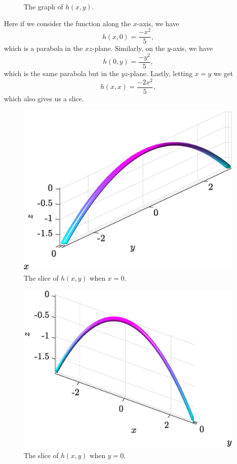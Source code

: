 \documentclass[12pt]{article} %
\begin{document}
\begin{solution}
\begin{enumerate}[(a)]
\begin{figure}[H]
        \caption{The graph of $h(x,y)$.}
    \end{figure}
    Here if we consider the function along the $x$-axis, we have
    \[
    h(x,0)= \frac{-x^2}{5},
    \]
    which is a parabola in the $xz$-plane. Similarly, on the $y$-axis, we have
    \[
    h(0,y) = \frac{-y^2}{5},
    \]
    which is the same parabola but in the $yz$-plane. Lastly, letting $x=y$ we get
    \[
    h(x,x) = \frac{-2x^2}{5},
    \]
    which also gives us a slice.
        \begin{figure}[H]
        \centering
        \includegraphics[width=.8\textwidth]{figures/3c_x=0}
        \caption{The slice of $h(x,y)$ when $x=0$.}
    \end{figure}
    \begin{figure}[H]
        \centering
        \includegraphics[width=.8\textwidth]{figures/3c_y=0}
        \caption{The slice of $h(x,y)$ when $y=0$.}
    \end{figure}
    \begin{figure}[H]

\end{figure}
\end{enumerate}
\end{solution}
\end{document}
